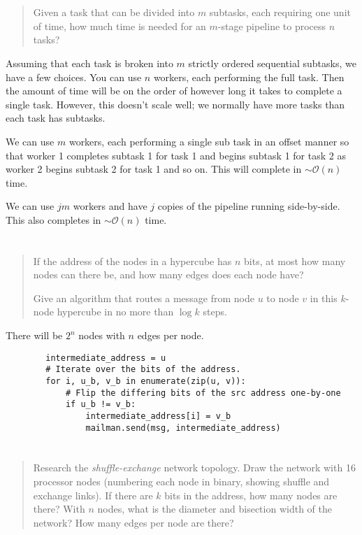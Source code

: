 \documentclass{article}
\begin{document}
\section{}
    \begin{quote}
        Given a task that can be divided into $m$ subtasks, each requiring one unit of time, how much time is needed for an $m$-stage pipeline to process $n$ tasks?
    \end{quote}

    Assuming that each task is broken into $m$ strictly ordered sequential subtasks, we have a few choices. You can use $n$ workers, each performing the full task. Then the amount of time will be on the order of however long it takes to complete a single task. However, this doesn't scale well; we normally have more tasks than each task has subtasks.

    We can use $m$ workers, each performing a single sub task in an offset manner so that worker 1 completes subtask 1 for task 1 and begins subtask 1 for task 2 as worker 2 begins subtask 2 for task 1 and so on. This will complete in $\sim \mathcal O(n)$ time.

    We can use $jm$ workers and have $j$ copies of the pipeline running side-by-side. This also completes in $\sim \mathcal O(n)$ time.

\section{}
    \begin{quote}
        If the address of the nodes in a hypercube has $n$ bits, at most how many nodes can there be, and how many edges does each node have?

        Give an algorithm that routes a message from node $u$ to node $v$ in this $k$-node hypercube in no more than $\log k$ steps.
    \end{quote}

    There will be $2^n$ nodes with $n$ edges per node.

    \begin{verbatim}
        intermediate_address = u
        # Iterate over the bits of the address.
        for i, u_b, v_b in enumerate(zip(u, v)):
            # Flip the differing bits of the src address one-by-one
            if u_b != v_b:
                intermediate_address[i] = v_b
                mailman.send(msg, intermediate_address)
    \end{verbatim}

\section{}
    \begin{quote}
        Research the \textit{shuffle-exchange} network topology. Draw the network with 16 processor nodes (numbering each node in binary, showing shuffle and exchange links). If there are $k$ bits in the address, how many nodes are there? With $n$ nodes, what is the diameter and bisection width of the network? How many edges per node are there?
    \end{quote}
\end{document}

